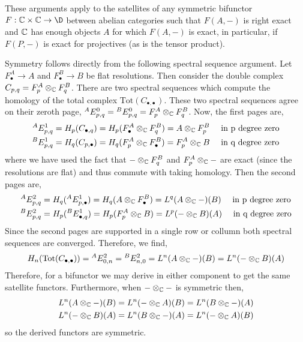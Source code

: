 \documentclass[12pt]{article}
\begin{document}
\begin{remark}
These arguments apply to the satellites of any symmetric bifunctor $F : \C \times \C \to \D$ between abelian categories such that $F(A, -)$ is right exact and $\mathbb{C}$ has enough objects $A$ for which $F(A, -)$ is exact, in particular, if $F(P, -)$ is exact for projectives (as is the tensor product). 
\end{remark}

\newcommand{\Tot}{\mathrm{Tot}}

\begin{remark}
Symmetry follows directly from the following spectral sequence argument. Let $F^A_\bullet \to A$ and $F^B_\bullet \to B$ be flat resolutions. Then consider the double complex $C_{p,q} = F^A_p \otimes_{\mathbb{C}} F^B_q$. There are two spectral sequences which compute the homology of the total complex $\Tot(C_{\bullet. \bullet})$. These two spectral sequences agree on their zeroth page, ${}^A E^0_{p,q} = {}^B E^0_{p,q} = F^A_p \otimes_{\mathbb{C}} F^B_q$. Now, the first pages are,
\begin{align*}
{}^A E^1_{p,q} & = H_{p}(C_{\bullet, q}) = H_{p}(F^A_\bullet \otimes_{\mathbb{C}} F^B_q) = A \otimes_{\mathbb{C}} F_p^B \quad \text{ in p degree zero}
\\
{}^B E^1_{p,q} & = H_{q}(C_{p, \bullet}) = H_{q}(F^A_p \otimes_{\mathbb{C}} F^B_\bullet) = F^A_p \otimes_{\mathbb{C}} B \quad \text{ in q degree zero}
\end{align*}
where we have used the fact that $- \otimes_{\mathbb{C}} F^B_q$ and $F^A_p \otimes_{\mathbb{C}} - $ are exact (since the resolutions are flat) and thus commute with taking homology. Then the second pages are,
\begin{align*}
{}^A E^2_{p,q} & = H_{q}({}^A E^1_{p, \bullet}) = H_{q}(A \otimes_{\mathbb{C}} F_\bullet^B) = L^q(A \otimes_{\mathbb{C}} -)(B) \quad \text{ in p degree zero}
\\
{}^B E^2_{p,q} & = H_{p}({}^B E^1_{\bullet, q}) = H_{p}(F^A_p \otimes_{\mathbb{C}} B) = L^p (- \otimes_{\mathbb{C}} B)(A) \quad \text{ in q degree zero}
\end{align*}
Since the second pages are supported in a single row or collumn both spectral sequences are converged. Therefore, we find,
\[ H_n(\Tot(C_{\bullet, \bullet})) = {}^A E^2_{0,n} = {}^B E^2_{n, 0} = L^n(A \otimes_\C -)(B) = L^n(- \otimes_\C B)(A) \] 
Therefore, for a bifunctor we may derive in either component to get the same satellite functors. Furthermore, when $- \otimes_{\mathbb{C}} -$ is symmetric then, 
\begin{align*}
L^n(A \otimes_{\mathbb{C}} -)(B) & = L^n(- \otimes_{\mathbb{C}} A)(B) = L^n(B \otimes_{\mathbb{C}} -)(A) 
\\
L^n(- \otimes_{\mathbb{C}} B)(A) & = L^n(B \otimes_{\mathbb{C}} -)(A) = L^n(- \otimes_{\mathbb{C}} A)(B) 
\end{align*}
so the derived functors are symmetric.
\end{remark}
\end{document}
